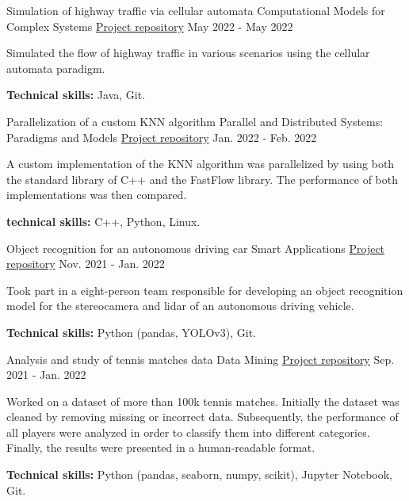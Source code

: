 \begin{cventries}
\cventry
{Simulation of highway traffic via cellular automata} %
{Computational Models for Complex Systems} %
{\href{https://github.com/nikodallanoce/TrafficAutomata}{\faGithubSquare Project repository}} %
{May 2022 - May 2022} %
{
    \begin{cvitems}
        \item{Simulated the flow of highway traffic in various scenarios using the cellular automata paradigm.}
        \item{\textbf{Technical skills:} Java, Git.}
    \end{cvitems}
}

\cventry
{Parallelization of a custom KNN algorithm} %
{Parallel and Distributed Systems: Paradigms and Models} %
{\href{https://github.com/RistoAle97/PDS}{\faGithubSquare Project repository}} %
{Jan. 2022 - Feb. 2022} %
{
    \begin{cvitems}
        \item{A custom implementation of the KNN algorithm was parallelized by using both the standard library of C++ and the FastFlow library. The performance of both implementations was then compared.}
        \item{\textbf{technical skills:} C++, Python, Linux.}
    \end{cvitems}
}

\cventry
{Object recognition for an autonomous driving car} %
{Smart Applications} %
{\href{https://github.com/unipi-smartapp-2021/sensory-cone-detection}{\faGithubSquare Project repository}} %
{Nov. 2021 - Jan. 2022} %
{
    \begin{cvitems}
        \item{Took part in a eight-person team responsible for developing an object recognition model for the stereocamera and lidar of an autonomous driving vehicle.}
        \item{\textbf{Technical skills:} Python (pandas, YOLOv3), Git.}
    \end{cvitems}
}

\cventry
{Analysis and study of tennis matches data} %
{Data Mining} %
{\href{https://github.com/nikodallanoce/DataMiningProject}{\faGithubSquare Project repository}} %
{Sep. 2021 - Jan. 2022} %
{
    \begin{cvitems}
        \item {Worked on a dataset of more than 100k tennis matches. Initially the dataset was cleaned by removing missing or incorrect data. Subsequently, the performance of all players were analyzed in order to classify them into different categories. Finally, the results were presented in a human-readable format.}
        \item{\textbf{Technical skills:} Python (pandas, seaborn, numpy, scikit), Jupyter Notebook, Git.}
    \end{cvitems}
}


\end{cventries}
